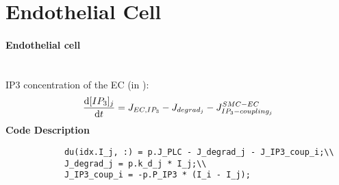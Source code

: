 \documentclass[fleqn]{report}
\numberwithin{equation}{section}
\numberwithin{equation}{section}
\begin{document}
 		\section{Endothelial Cell}
 			\paragraph{Endothelial cell}~\\
 			\gls{IP3} concentration of the \gls{EC} (in \uM):
 			\begin{equation} \label{eq:dIjdt}
 			\dfrac{\mathrm{d}[IP_{3}]_{j}}{\mathrm{d}t} =  J_{EC,IP_3}- J_{degrad_{j}}  - J^{SMC-EC}_{IP_{3}-coupling_{j}}
 			\end{equation}
 			\textbf{Code Description}
 			\begin{verbatim}
 			du(idx.I_j, :) = p.J_PLC - J_degrad_j - J_IP3_coup_i;\\
 			J_degrad_j = p.k_d_j * I_j;\\
 			J_IP3_coup_i = -p.P_IP3 * (I_i - I_j);
 			\end{verbatim}
\end{document}
